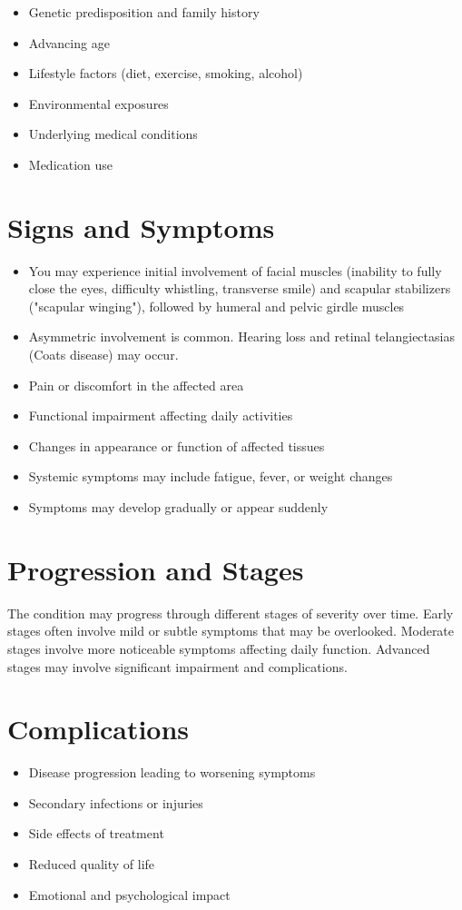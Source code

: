\begin{itemize}[noitemsep]
  \item Genetic predisposition and family history
  \item Advancing age
  \item Lifestyle factors (diet, exercise, smoking, alcohol)
  \item Environmental exposures
  \item Underlying medical conditions
  \item Medication use
\end{itemize}
\section{Signs and Symptoms}
\begin{itemize}[noitemsep]
  \item You may experience initial involvement of facial muscles (inability to fully close the eyes, difficulty whistling, transverse smile) and scapular stabilizers ("scapular winging"), followed by humeral and pelvic girdle muscles
  \item Asymmetric involvement is common. Hearing loss and retinal telangiectasias (Coats disease) may occur.
  \item Pain or discomfort in the affected area
  \item Functional impairment affecting daily activities
  \item Changes in appearance or function of affected tissues
  \item Systemic symptoms may include fatigue, fever, or weight changes
  \item Symptoms may develop gradually or appear suddenly
\end{itemize}
\section{Progression and Stages}
The condition may progress through different stages of severity over time. Early stages often involve mild or subtle symptoms that may be overlooked. Moderate stages involve more noticeable symptoms affecting daily function. Advanced stages may involve significant impairment and complications.
\section{Complications}
\begin{itemize}[noitemsep]
  \item Disease progression leading to worsening symptoms
  \item Secondary infections or injuries
  \item Side effects of treatment
  \item Reduced quality of life
  \item Emotional and psychological impact
\end{itemize}
